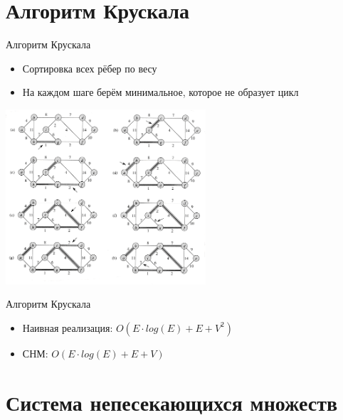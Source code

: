 \documentclass[10pt]{beamer}
\begin{document}
\section{Алгоритм Крускала}
\begin{frame}[fragile]{Алгоритм Крускала}
\begin{itemize}
    \item Сортировка всех рёбер по весу
    \item На каждом шаге берём минимальное, которое не образует цикл
\end{itemize}
\begin{center}
\includegraphics[height=6.5cm]{Term_2/Source/images/kruskal.png}
\end{center}
\end{frame}

\begin{frame}[fragile]{Алгоритм Крускала}
\begin{itemize}
    \item Наивная реализация: $O(E \cdot log(E) + E + V^2)$
    \item СНМ: $O(E \cdot log(E) + E + V)$
\end{itemize}
\end{frame}

\section{Система непесекающихся множеств}
\end{document}
